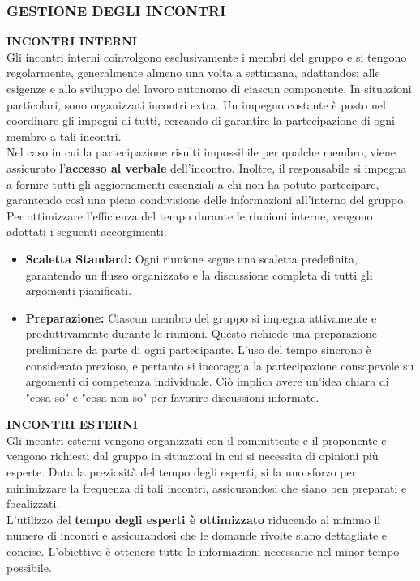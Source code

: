 \documentclass{article}
\begin{document}
\subsubsection{GESTIONE DEGLI INCONTRI}
\textbf{INCONTRI INTERNI}\\
Gli incontri interni coinvolgono esclusivamente i membri del gruppo e si tengono regolarmente, generalmente almeno una volta a settimana, adattandosi alle esigenze e allo sviluppo del lavoro autonomo di ciascun componente. In situazioni particolari, sono organizzati incontri extra. Un impegno costante è posto nel coordinare gli impegni di tutti, cercando di garantire la partecipazione di ogni membro a tali incontri.\\
Nel caso in cui la partecipazione risulti impossibile per qualche membro, viene assicurato l'\textbf{accesso al verbale} dell'incontro. Inoltre, il responsabile si impegna a fornire tutti gli aggiornamenti essenziali a chi non ha potuto partecipare, garantendo così una piena condivisione delle informazioni all'interno del gruppo.\\
Per ottimizzare l'efficienza del tempo durante le riunioni interne, vengono adottati i seguenti accorgimenti:
\begin{itemize}
    \item \textbf{Scaletta Standard:} Ogni riunione segue una scaletta predefinita, garantendo un flusso organizzato e la discussione completa di tutti gli argomenti pianificati.
    \item \textbf{Preparazione:} Ciascun membro del gruppo si impegna attivamente e produttivamente durante le riunioni. Questo richiede una preparazione preliminare da parte di ogni partecipante. L'uso del tempo sincrono è considerato prezioso, e pertanto si incoraggia la partecipazione consapevole su argomenti di competenza individuale. Ciò implica avere un'idea chiara di "cosa so" e "cosa non so" per favorire discussioni informate.
\end{itemize}
\textbf{INCONTRI ESTERNI}\\
Gli incontri esterni vengono organizzati con il committente e il proponente e vengono richiesti dal gruppo in situazioni in cui si necessita di opinioni più esperte. Data la preziosità del tempo degli esperti, si fa uno sforzo per minimizzare la frequenza di tali incontri, assicurandosi che siano ben preparati e focalizzati.\\ 
L'utilizzo del \textbf{tempo degli esperti è ottimizzato} riducendo al minimo il numero di incontri e assicurandosi che le domande rivolte siano dettagliate e concise. L'obiettivo è ottenere tutte le informazioni necessarie nel minor tempo possibile.\\
\end{document}
